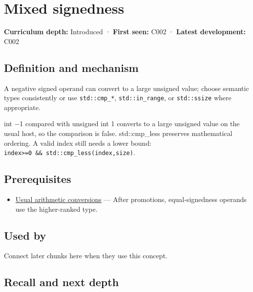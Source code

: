 \hypertarget{appendix-736a2345de4a}{}\label{referencestart:appendix-736a2345de4a}
\section{Mixed signedness}\label{appendix-736a2345de4a-mixed-signedness}

\textbf{Curriculum depth:} Introduced · \textbf{First seen:} C002 · \textbf{Latest development:} C002

\begin{allmightroledefinition}

\subsection{Definition and mechanism}\label{appendix-736a2345de4a-definition-and-mechanism}

A negative signed operand can convert to a large unsigned value; choose semantic types consistently or use \texttt{std::cmp\_*}, \texttt{std::in\_range}, or \texttt{std::ssize} where appropriate.

\end{allmightroledefinition}

int −1 compared with unsigned int 1 converts to a large unsigned value on the usual host, so the comparison is false. std::cmp\_less preserves mathematical ordering. A valid index still needs a lower bound: \texttt{index\textgreater{}=0\ \&\&\ std::cmp\_less(index,size)}.

\subsection{Prerequisites}\label{appendix-736a2345de4a-prerequisites}

\begin{itemize}
\tightlist
\item
  \hyperref[appendix-5e2d663adf7f]{Usual arithmetic conversions} --- After promotions, equal-signedness operands use the higher-ranked type.
\end{itemize}

\subsection{Used by}\label{appendix-736a2345de4a-used-by}

Connect later chunks here when they use this concept.

\subsection{Recall and next depth}\label{appendix-736a2345de4a-recall-and-next-depth}

